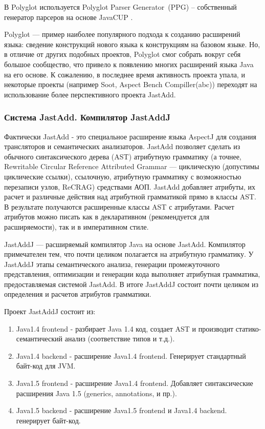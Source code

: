 \documentclass[a4paper,12pt]{article}
\begin{document}
В Polyglot используется Polyglot Parser Generator~(PPG) -- собственный генератор
парсеров на основе JavaCUP \cite{javacup}.

Polyglot --- пример наиболее популярного подхода к созданию расширений языка:
сведение конструкций нового языка к конструкциям на базовом языке. Но, в
отличие от других подобных проектов, Polyglot смог собрать вокруг себя большое
сообщество, что привело к появлению многих расширений языка Java на его основе.
К сожалению, в последнее время активность проекта упала, и некоторые проекты
(например Soot, Aspect Bench Compiller(abc)) переходят на использование более
перспективного проекта JastAdd.

\subsubsection*{Система JastAdd. Компилятор JastAddJ}
Фактически JastAdd - это специальное расширение языка AspectJ для создания
трансляторов и семантических анализаторов. JastAdd позволяет сделать из
обычного синтаксического дерева (AST) атрибутную грамматику (а точнее, 
Rewritable Circular Reference Attributed Grammar --- циклическую (допустимы
циклические ссылки), ссылочную, атрибутную грамматику с возможностью
перезаписи узлов, ReCRAG) средствами АОП. JastAdd добавляет атрибуты, их расчет
и различные действия над атрибутной грамматикой прямо в классы AST. В
результате получаются расширенные классы AST с атрибутами. Расчет атрибутов
можно писать как в декларативном (рекомендуется для расширяемости), так и в
императивном стиле.

JastAddJ --- расширяемый компилятор Java на основе JastAdd. Компилятор
примечателен тем, что почти целиком полагается на атрибутную грамматику. У
JastAddJ этапы семантического анализа, генерации промежуточного представления,
оптимизации и генерации кода выполняет атрибутная грамматика, предоставляемая
системой JastAdd. В итоге JastAddJ состоит почти целиком из определения и
расчетов атрибутов грамматики.

Проект JastAddJ состоит из:
\begin{enumerate}
  \item Java1.4 frontend - разбирает Java 1.4 код, создает AST и производит
  статико-семантический анализ (соответствие типов и т.д.).
  \item Java1.4 backend - расширение Java1.4 frontend. Генерирует стандартный байт-код
  для JVM.
  \item Java1.5 frontend - расширение Java1.4 frontend. Добавляет синтаксические
  расширения Java 1.5 (generics, annotations, и пр.).
  \item Java1.5 backend - расширение Java1.5 frontend и Java1.4 backend. генерирует
  байт-код.
\end{enumerate}
\end{document}
